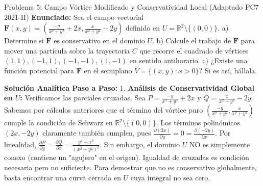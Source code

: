 \documentclass[11pt,a4paper]{article}
\begin{document}
\begin{ejerciciobox}{Problema 5: Campo Vórtice Modificado y Conservatividad Local (Adaptado PC7 2021-II)}
\textbf{Enunciado:}
Sea el campo vectorial $\mathbf{F}(x,y) = \left( \frac{-y}{x^2+y^2} + 2x, \frac{x}{x^2+y^2} - 2y \right)$ definido en $U = \mathbb{R}^2 \setminus \{(0,0)\}$.
a) Determine si $\mathbf{F}$ es conservativo en el dominio $U$.
b) Calcule el trabajo de $\mathbf{F}$ para mover una partícula sobre la trayectoria $C$ que recorre el cuadrado de vértices $(1,1), (-1,1), (-1,-1), (1,-1)$ en sentido antihorario.
c) ¿Existe una función potencial para $\mathbf{F}$ en el semiplano $V = \{(x,y) : x > 0\}$? Si es así, hállala.

\textbf{Solución Analítica Paso a Paso:}
1. \textbf{Análisis de Conservatividad Global en $U$:}
Verificamos las parciales cruzadas. Sea $P = \frac{-y}{x^2+y^2} + 2x$ y $Q = \frac{x}{x^2+y^2} - 2y$.
Sabemos por cálculos anteriores que el término del vórtice puro $\left(\frac{-y}{x^2+y^2}, \frac{x}{x^2+y^2}\right)$ cumple la condición de Schwarz en $\mathbb{R}^2 \setminus \{(0,0)\}$.
Los términos polinómicos $(2x, -2y)$ claramente también cumplen, pues $\frac{\partial (2x)}{\partial y} = 0 = \frac{\partial (-2y)}{\partial x}$.
Por linealidad, $\frac{\partial P}{\partial y} = \frac{\partial Q}{\partial x} = \frac{y^2-x^2}{(x^2+y^2)^2}$.
Sin embargo, el dominio $U$ NO es simplemente conexo (contiene un "agujero" en el origen). Igualdad de cruzadas es condición necesaria pero no suficiente.
Para demostrar que no es conservativo globalmente, basta encontrar una curva cerrada en $U$ cuya integral no sea cero.


\end{ejerciciobox}
\end{document}
